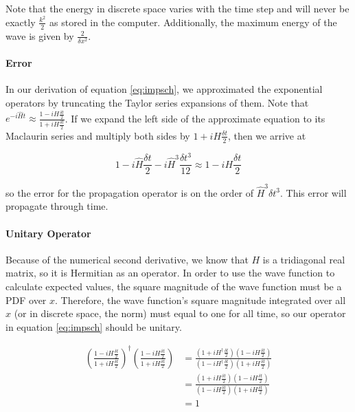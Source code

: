 Note that the energy in discrete space varies with the time step and will
never be exactly $\frac{k^2}{2}$ as stored in the computer. Additionally,
the maximum energy of the wave is given by $\frac{2}{\delta x^2}$.

\paragraph{Error} In our derivation of equation \eqref{eq:impsch}, we
approximated the exponential operators by truncating the Taylor series
expansions of them. Note that $e^{-i\hat{H}t} \approx
\frac{1 - iH\frac{\delta t}{2}}{1 + iH\frac{\delta t}{2}}$. If we expand the
left side of the approximate equation to its Maclaurin series and multiply
both sides by $1 + iH\frac{\delta t}{2}$, then we arrive at

\[
    1 - i\hat{H}\frac{\delta t}{2} - i\hat{H}^3\frac{\delta t^3}{12}
    \approx
    1 - iH\frac{\delta t}{2}
\]

so the error for the propagation operator is on the order of $\hat{H}^3
\delta t^3$. This error will propagate through time.

\paragraph{Unitary Operator} Because of the numerical second derivative, we
know that $H$ is a tridiagonal real matrix, so it is Hermitian as an
operator. In order to use the wave function to calculate expected values,
the square magnitude of the wave function must be a PDF over $x$.
Therefore, the wave function's square magnitude integrated over all $x$ (or
in discrete space, the norm) must equal to one for all time, so our operator
in equation \eqref{eq:impsch} should be unitary.

\begin{align*}
    \left(
    \frac{1 - iH\frac{\delta t}{2}}{1 + iH\frac{\delta t}{2}}
    \right)^\dag
    \left(
    \frac{1 - iH\frac{\delta t}{2}}{1 + iH\frac{\delta t}{2}}
    \right)
    &=
    \frac{\left(1 + iH^\dag\frac{\delta t}{2}\right)
    \left(1 - iH\frac{\delta t}{2}\right)}
    {\left(1 - iH^\dag\frac{\delta t}{2}\right)
    \left(1 + iH\frac{\delta t}{2}\right)}
    \\
    &=
    \frac{\left(1 + iH\frac{\delta t}{2}\right)
    \left(1 - iH\frac{\delta t}{2}\right)}
    {\left(1 - iH\frac{\delta t}{2}\right)
    \left(1 + iH\frac{\delta t}{2}\right)}
    \\
    &= 1
\end{align*}
\vspace{-0.9cm}

